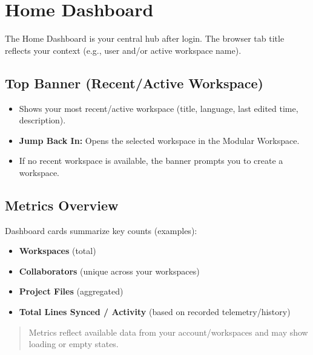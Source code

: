 \documentclass[11pt,a4paper]{article}
\begin{document}
\section{Home Dashboard}

The Home Dashboard is your central hub after login. The browser tab title reflects your context (e.g., user and/or active workspace name).

\subsection{Top Banner (Recent/Active Workspace)}
\begin{itemize}
  \item Shows your most recent/active workspace (title, language, last edited time, description).
  \item \textbf{Jump Back In:} Opens the selected workspace in the Modular Workspace.
  \item If no recent workspace is available, the banner prompts you to create a workspace.
\end{itemize}

\subsection{Metrics Overview}
Dashboard cards summarize key counts (examples):
\begin{itemize}
  \item \textbf{Workspaces} (total)
  \item \textbf{Collaborators} (unique across your workspaces)
  \item \textbf{Project Files} (aggregated)
  \item \textbf{Total Lines Synced / Activity} (based on recorded telemetry/history)
\end{itemize}

\begin{quote}
Metrics reflect available data from your account/workspaces and may show loading or empty states.
\end{quote}
\end{document}
